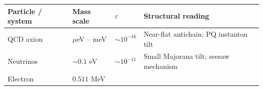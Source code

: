 \begin{longtable}[]{@{}llll@{}}
\toprule
\begin{minipage}[b]{0.22\columnwidth}\raggedright
Particle / system\strut
\end{minipage} & \begin{minipage}[b]{0.22\columnwidth}\raggedright
Mass scale\strut
\end{minipage} & \begin{minipage}[b]{0.22\columnwidth}\raggedright
\(\varepsilon\)\strut
\end{minipage} & \begin{minipage}[b]{0.22\columnwidth}\raggedright
Structural reading\strut
\end{minipage}\tabularnewline
\midrule
\endhead
\begin{minipage}[t]{0.22\columnwidth}\raggedright
QCD axion\strut
\end{minipage} & \begin{minipage}[t]{0.22\columnwidth}\raggedright
\(\mu\)eV -- meV\strut
\end{minipage} & \begin{minipage}[t]{0.22\columnwidth}\raggedright
\(\sim 10^{-16}\)\strut
\end{minipage} & \begin{minipage}[t]{0.22\columnwidth}\raggedright
Near-flat antichain; PQ instanton tilt\strut
\end{minipage}\tabularnewline
\begin{minipage}[t]{0.22\columnwidth}\raggedright
Neutrinos\strut
\end{minipage} & \begin{minipage}[t]{0.22\columnwidth}\raggedright
\(\sim 0.1\) eV\strut
\end{minipage} & \begin{minipage}[t]{0.22\columnwidth}\raggedright
\(\sim 10^{-11}\)\strut
\end{minipage} & \begin{minipage}[t]{0.22\columnwidth}\raggedright
Small Majorana tilt; seesaw mechanism\strut
\end{minipage}\tabularnewline
\begin{minipage}[t]{0.22\columnwidth}\raggedright
Electron\strut
\end{minipage} & \begin{minipage}[t]{0.22\columnwidth}\raggedright
\(0.511\) MeV\strut
\end{minipage} & \begin{minipage}[t]{0.22\columnwidth}\raggedright

\end{minipage}
\end{longtable}
